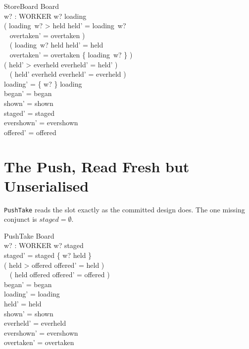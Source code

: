 \documentclass[a4paper,10pt,fleqn]{article}
\begin{document}
\begin{schema}{StoreBoard}
  \Delta Board \\
  w? : WORKER
\where
  w? \in \dom loading \\
  ( loading~w? > held \land held' = loading~w? \\
  \quad~ \land overtaken' = overtaken ) \lor \\
  \quad~ ( loading~w? \leq held \land held' = held \\
  \quad~ \land overtaken' = overtaken \cup \{ loading~w? \} ) \\
  ( held' > everheld \land everheld' = held' ) \lor \\
  \quad~ ( held' \leq everheld \land everheld' = everheld ) \\
  loading' = \{ w? \} \ndres loading \\
  began' = began \\
  shown' = shown \\
  staged' = staged \\
  evershown' = evershown \\
  offered' = offered
\end{schema}

\section{The Push, Read Fresh but Unserialised}

\texttt{PushTake} reads the slot exactly as the committed design does. The one
missing conjunct is $staged = \emptyset$.

\begin{schema}{PushTake}
  \Delta Board \\
  w? : WORKER
\where
  w? \notin \dom staged \\
  staged' = staged \cup \{ w? \mapsto held \} \\
  ( held > offered \land offered' = held ) \lor \\
  \quad~ ( held \leq offered \land offered' = offered ) \\
  began' = began \\
  loading' = loading \\
  held' = held \\
  shown' = shown \\
  everheld' = everheld \\
  evershown' = evershown \\
  overtaken' = overtaken
\end{schema}
\end{document}
